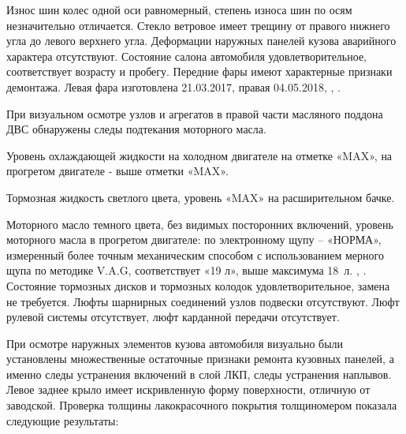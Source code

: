 
 Износ шин колес одной оси равномерный, степень износа шин по осям незначительно отличается.   Стекло ветровое имеет трещину от правого нижнего угла до левого верхнего угла. Деформации  наружных панелей кузова аварийного характера отсутствуют. Состояние салона автомобиля удовлетворительное, соответствует возрасту и пробегу.  Передние фары имеют характерные признаки демонтажа.  Левая фара изготовлена 21.03.2017, правая 04.05.2018, , .
 
 
 При визуальном осмотре узлов и агрегатов в правой части масляного поддона ДВС обнаружены следы подтекания  моторного масла.
   
 Уровень охлаждающей жидкости на холодном двигателе на отметке «MAX», на прогретом двигателе - выше отметки «MAX». 
 
 Тормозная жидкость  светлого цвета, уровень «MAX» на расширительном бачке.
 
 Моторного масло темного цвета, без видимых посторонних включений, уровень моторного масла в прогретом двигателе: по электронному щупу – «НОРМА»,   измеренный более точным механическим способом с использованием мерного щупа по методике V.A.G,  соответствует «19 л»,  выше максимума 18~л. , . Состояние тормозных дисков и тормозных колодок удовлетворительное,  замена не требуется. Люфты шарнирных соединений узлов подвески отсутствуют. Люфт рулевой системы отсутствует,  люфт карданной передачи отсутствует. 
 
 
При осмотре наружных элементов кузова  автомобиля визуально были установлены множественные остаточные признаки ремонта кузовных панелей, а именно следы устранения включений в слой ЛКП, следы устранения наплывов. Левое заднее крыло имеет искривленную форму поверхности, отличную от заводской.  Проверка толщины лакокрасочного покрытия  толщиномером  показала следующие результаты:\\

